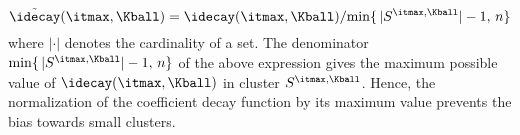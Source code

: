 \documentclass[journal]{IEEEtran}
\begin{document}
%
%
\begin{equation} 
\label{eq:defn_decayfun_goc}
\tilde \idecay(\itmax, \Kball) =   \idecay(\itmax, \Kball)  / 
{\min \{ \, |S^{\itmax,\Kball}| -1, \, n \}}
\end{equation} 
%
where $| \cdot |$ denotes the cardinality of a set. The denominator $\min \{ \, |S^{\itmax,\Kball}| -1, \, n \}$ of the above expression gives the maximum possible value of $\idecay(\itmax, \Kball)$ in cluster $S^{\itmax,\Kball}$. Hence, the normalization of the coefficient decay function by its maximum value prevents the bias towards small clusters. 
\end{document}
